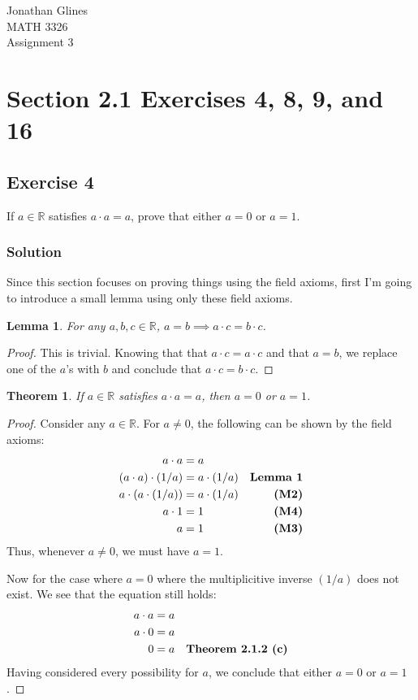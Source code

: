 \documentclass[12pt]{article}
\newtheorem*{thm}{Theorem}
\newtheorem{lem}{Lemma}
\begin{document}
\begin{flushright}
{\Large
Jonathan Glines \\
MATH 3326 \\
Assignment 3 \\
}
\end{flushright}
\section*{Section 2.1 Exercises 4, 8, 9, and 16}
\subsection*{Exercise 4}
If $a \in \mathbb{R}$ satisfies $a \cdot a = a$, prove that either $a = 0$ or $a = 1$.
\subsubsection*{Solution}
Since this section focuses on proving things using the field axioms, first I'm going to introduce a small lemma using only these field axioms.
\begin{lem}
For any $a, b, c \in \mathbb{R}$, $a = b \implies a \cdot c = b \cdot c$.
\end{lem}
\begin{proof}
This is trivial. Knowing that that $a \cdot c = a \cdot c$ and that $a = b$, we replace one of the $a$'s with $b$ and conclude that $a \cdot c = b \cdot c$.
\end{proof}

\begin{thm}
If $a \in \mathbb{R}$ satisfies $a \cdot a = a$, then $a = 0$ or $a = 1$.
\end{thm}
\begin{proof}
Consider any $a \in \mathbb{R}$. For $a \neq 0$, the following can be shown by the field axioms:
\begin{align*}
a \cdot a &= a \\
\left(a \cdot a\right) \cdot \left(1/a\right) &= a \cdot \left(1 / a\right) & \text{\bf Lemma 1}\\
a \cdot \left(a \cdot \left(1/a\right)\right) &= a \cdot \left(1/a\right) & \text{\bf (M2)} \\
a \cdot 1 &= 1 & \text{\bf (M4)}\\
a &= 1 & \text{\bf (M3)}
\end{align*}
Thus, whenever $a \neq 0$, we must have $a = 1$.

Now for the case where $a = 0$ where the multiplicitive inverse $\left(1/a\right)$ does not exist. We see that the equation still holds:
\begin{align*}
a \cdot a &= a \\
a \cdot 0 &= a \\
0 &= a & \text{\bf Theorem 2.1.2 (c)}
\end{align*}
Having considered every possibility for $a$, we conclude that either $a = 0$ or $a = 1$.
\end{proof}
\end{document}
